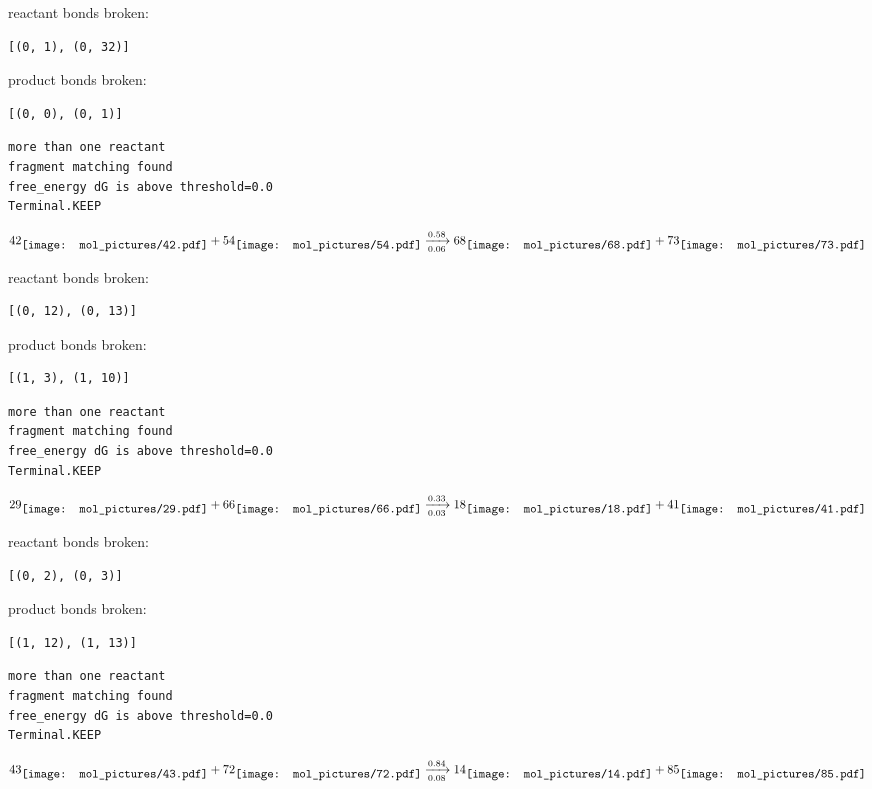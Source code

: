 \documentclass{article}
\begin{document}
reactant bonds broken:\begin{verbatim}
[(0, 1), (0, 32)]
\end{verbatim}
product bonds broken:\begin{verbatim}
[(0, 0), (0, 1)]
\end{verbatim}




\vspace{1cm}
\begin{verbatim}
more than one reactant
fragment matching found
free_energy dG is above threshold=0.0
Terminal.KEEP
\end{verbatim}
$$
42
\raisebox{-.5\height}{\texttt{[image: mol\_pictures/42.pdf]}}
+
54
\raisebox{-.5\height}{\texttt{[image: mol\_pictures/54.pdf]}}
\xrightarrow[0.06]{0.58}
68
\raisebox{-.5\height}{\texttt{[image: mol\_pictures/68.pdf]}}
+
73
\raisebox{-.5\height}{\texttt{[image: mol\_pictures/73.pdf]}}
$$


reactant bonds broken:\begin{verbatim}
[(0, 12), (0, 13)]
\end{verbatim}
product bonds broken:\begin{verbatim}
[(1, 3), (1, 10)]
\end{verbatim}




\vspace{1cm}
\begin{verbatim}
more than one reactant
fragment matching found
free_energy dG is above threshold=0.0
Terminal.KEEP
\end{verbatim}
$$
29
\raisebox{-.5\height}{\texttt{[image: mol\_pictures/29.pdf]}}
+
66
\raisebox{-.5\height}{\texttt{[image: mol\_pictures/66.pdf]}}
\xrightarrow[0.03]{0.33}
18
\raisebox{-.5\height}{\texttt{[image: mol\_pictures/18.pdf]}}
+
41
\raisebox{-.5\height}{\texttt{[image: mol\_pictures/41.pdf]}}
$$


reactant bonds broken:\begin{verbatim}
[(0, 2), (0, 3)]
\end{verbatim}
product bonds broken:\begin{verbatim}
[(1, 12), (1, 13)]
\end{verbatim}




\vspace{1cm}
\begin{verbatim}
more than one reactant
fragment matching found
free_energy dG is above threshold=0.0
Terminal.KEEP
\end{verbatim}
$$
43
\raisebox{-.5\height}{\texttt{[image: mol\_pictures/43.pdf]}}
+
72
\raisebox{-.5\height}{\texttt{[image: mol\_pictures/72.pdf]}}
\xrightarrow[0.08]{0.84}
14
\raisebox{-.5\height}{\texttt{[image: mol\_pictures/14.pdf]}}
+
85
\raisebox{-.5\height}{\texttt{[image: mol\_pictures/85.pdf]}}
$$
\end{document}
